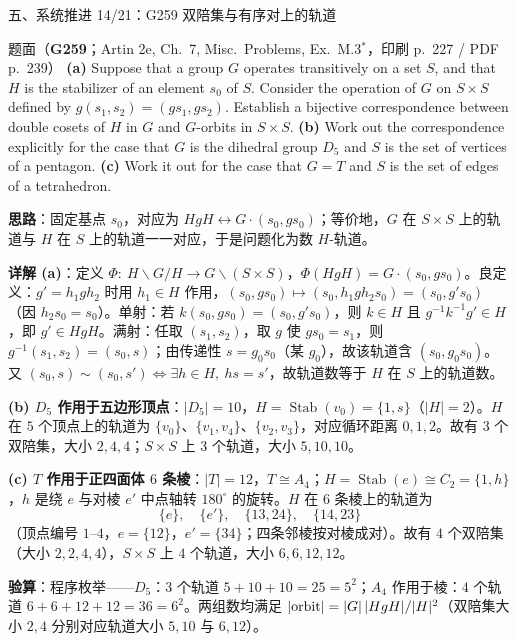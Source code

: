 \documentclass[aspectratio=169,10pt,fontset=none]{ctexbeamer}
\newcommand{\ex}[1]{\textcolor{accent}{\footnotesize\bfseries #1}}
\newcommand{\key}[1]{\textcolor{ink}{\bfseries #1}}
\begin{document}
\begin{frame}[t]{五、系统推进 14/21：G259 双陪集与有序对上的轨道}
\label{ex:G259}
\scriptsize
\begin{block}{\footnotesize 题面（\ex{G259}；Artin 2e, Ch.~7, Misc.\ Problems, Ex.~M.3$^\ast$，印刷 p.~227 / PDF p.~239）}
\textbf{(a)} Suppose that a group $G$ operates transitively on a set $S$, and that $H$ is the stabilizer of an element $s_0$ of $S$. Consider the operation of $G$ on $S\times S$ defined by $g(s_1,s_2)=(gs_1,gs_2)$. Establish a bijective correspondence between double cosets of $H$ in $G$ and $G$-orbits in $S\times S$.
\textbf{(b)} Work out the correspondence explicitly for the case that $G$ is the dihedral group $D_5$ and $S$ is the set of vertices of a pentagon.
\textbf{(c)} Work it out for the case that $G=T$ and $S$ is the set of edges of a tetrahedron.
\end{block}
\key{思路}：固定基点 $s_0$，对应为 $HgH\leftrightarrow G\cdot(s_0,gs_0)$；等价地，$G$ 在 $S\times S$ 上的轨道与 $H$ 在 $S$ 上的轨道一一对应，于是问题化为数 $H$-轨道。

\key{详解 (a)}：定义 $\Phi:\ H\backslash G/H\to G\backslash(S\times S)$，$\Phi(HgH)=G\cdot(s_0,gs_0)$。良定义：$g'=h_1gh_2$ 时用 $h_1\in H$ 作用，$(s_0,gs_0)\mapsto(s_0,h_1gh_2s_0)=(s_0,g's_0)$（因 $h_2s_0=s_0$）。单射：若 $k(s_0,gs_0)=(s_0,g's_0)$，则 $k\in H$ 且 $g^{-1}k^{-1}g'\in H$，即 $g'\in HgH$。满射：任取 $(s_1,s_2)$，取 $g$ 使 $gs_0=s_1$，则 $g^{-1}(s_1,s_2)=(s_0,s)$；由传递性 $s=g_0s_0$（某 $g_0$），故该轨道含 $(s_0,g_0s_0)$。又 $(s_0,s)\sim(s_0,s')\iff\exists h\in H,\ hs=s'$，故轨道数等于 $H$ 在 $S$ 上的轨道数。

\key{(b) $D_5$ 作用于五边形顶点}：$|D_5|=10$，$H=\operatorname{Stab}(v_0)=\{1,s\}$（$|H|=2$）。$H$ 在 $5$ 个顶点上的轨道为 $\{v_0\}$、$\{v_1,v_4\}$、$\{v_2,v_3\}$，对应循环距离 $0,1,2$。故有 $3$ 个双陪集，大小 $2,4,4$；$S\times S$ 上 $3$ 个轨道，大小 $5,10,10$。

\key{(c) $T$ 作用于正四面体 $6$ 条棱}：$|T|=12$，$T\cong A_4$；$H=\operatorname{Stab}(e)\cong C_2=\{1,h\}$，$h$ 是绕 $e$ 与对棱 $e'$ 中点轴转 $180^\circ$ 的旋转。$H$ 在 $6$ 条棱上的轨道为
\[
\{e\},\quad\{e'\},\quad\{13,24\},\quad\{14,23\}
\]
（顶点编号 $1$–$4$，$e=\{12\}$，$e'=\{34\}$；四条邻棱按对棱成对）。故有 $4$ 个双陪集（大小 $2,2,4,4$），$S\times S$ 上 $4$ 个轨道，大小 $6,6,12,12$。

\key{验算}：程序枚举——$D_5$：$3$ 个轨道 $5+10+10=25=5^2$；$A_4$ 作用于棱：$4$ 个轨道 $6+6+12+12=36=6^2$。两组数均满足 $|{\rm orbit}|=|G|\,|HgH|/|H|^2$（双陪集大小 $2,4$ 分别对应轨道大小 $5,10$ 与 $6,12$）。
\end{frame}
\end{document}
